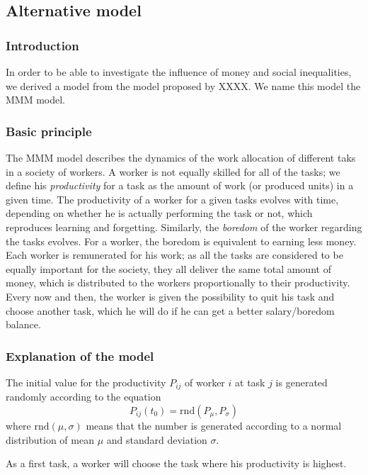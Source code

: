 \newcommand{\rnd}[2]{\mathrm{rnd}(#1,#2)}


\subsection{Alternative model}

\subsubsection{Introduction}
In order to be able to investigate the influence of money and social inequalities, we derived a model from the model proposed by XXXX. We name this model the MMM model.

\subsubsection{Basic principle}
The MMM model describes the dynamics of the work allocation of different taks in a society of workers. 
A worker is not equally skilled for all of the tasks; we define his \emph{productivity} for a task as the amount of work (or produced units) in a given time. 
The productivity of a worker for a given tasks evolves with time, depending on whether he is actually performing the task or not, which reproduces learning and forgetting. Similarly, the \emph{boredom} of the worker regarding the tasks evolves. For a worker, the boredom is equivalent to earning less money.
Each worker is remunerated for his work; as all the tasks are considered to be equally important for the society, they all deliver the same total amount of money, which is distributed to the workers proportionally to their productivity.
Every now and then, the worker is given the possibility to quit his task and choose another task, which he will do if he can get a better salary/boredom balance. 


\subsubsection{Explanation of the model}
The initial value for the productivity $P_{ij}$ of worker $i$ at task $j$ is generated randomly according to the equation
\begin{equation}
	P_{ij}(t_0) = \rnd{P_\mu}{P_\sigma}
\end{equation}
where $\rnd{\mu}{\sigma}$ means that the number is generated according to a normal distribution of mean $\mu$ and standard deviation $\sigma$.

As a first task, a worker will choose the task where his productivity is highest.

